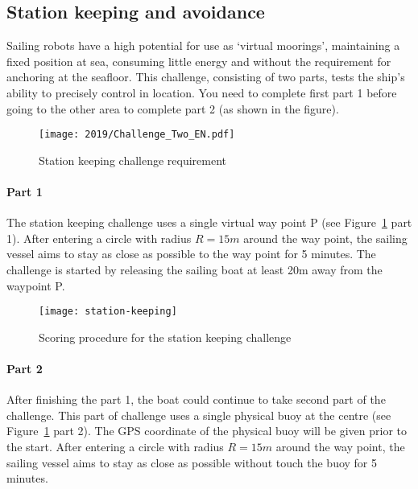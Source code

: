 \documentclass[12pt]{article}
\begin{document}
\subsection{Station keeping and avoidance}
Sailing robots have a high potential for use as `virtual moorings', maintaining
a fixed position at sea, consuming little energy and without the requirement for
anchoring at the seafloor.
This challenge, consisting of two parts, tests the ship's ability to precisely control in location. 
You need to complete first part 1 before going to the other area to complete part 2 (as shown in the figure). 

\begin{figure}[H]
  \centering
  \texttt{[image: 2019/Challenge\_Two\_EN.pdf]}
  \caption{Station keeping challenge requirement}
  \label{fig:stationkeeping_requirement}
\end{figure}

\paragraph{Part 1}

The station keeping challenge uses a single virtual way point P
(see Figure~\ref{fig:stationkeeping_requirement} part 1). 
After entering a circle with radius $R=15m$ around the way point, the 
sailing vessel aims to stay as close as possible to the way point for 5 minutes.
The challenge is started by releasing the sailing boat at least 20m away
from the waypoint P.


\begin{figure}[H]
  \centering
  \texttt{[image: station-keeping]}
  \caption{Scoring procedure for the station keeping challenge}
  \label{fig:stationkeeping}
\end{figure}

\paragraph{Part 2}

After finishing the part 1, the boat could continue to take second part of the challenge.
This part of challenge uses a single physical buoy at the centre (see Figure~\ref{fig:stationkeeping_requirement} part 2). 
The GPS coordinate of the physical buoy will be given prior to the start. 
After entering a circle with radius $R=15m$ around the way point, the 
sailing vessel aims to stay as close as possible without touch the buoy for 5 minutes.
\end{document}
